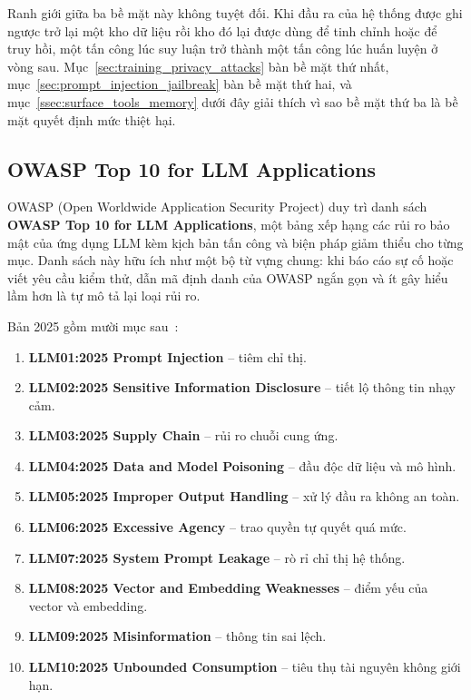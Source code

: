 Ranh giới giữa ba bề mặt này không tuyệt đối. Khi đầu ra của hệ thống được ghi ngược trở lại một kho dữ liệu rồi kho đó lại được dùng để tinh chỉnh hoặc để truy hồi, một tấn công lúc suy luận trở thành một tấn công lúc huấn luyện ở vòng sau. Mục~\ref{sec:training_privacy_attacks} bàn bề mặt thứ nhất, mục~\ref{sec:prompt_injection_jailbreak} bàn bề mặt thứ hai, và mục~\ref{ssec:surface_tools_memory} dưới đây giải thích vì sao bề mặt thứ ba là bề mặt quyết định mức thiệt hại.

\subsection{OWASP Top 10 for LLM Applications}
\label{ssec:owasp_llm_top10}

OWASP (Open Worldwide Application Security Project) duy trì danh sách \textbf{OWASP Top 10 for LLM Applications}, một bảng xếp hạng các rủi ro bảo mật của ứng dụng LLM kèm kịch bản tấn công và biện pháp giảm thiểu cho từng mục. Danh sách này hữu ích như một bộ từ vựng chung: khi báo cáo sự cố hoặc viết yêu cầu kiểm thử, dẫn mã định danh của OWASP ngắn gọn và ít gây hiểu lầm hơn là tự mô tả lại loại rủi ro.

Bản 2025 gồm mười mục sau~\cite{owasp2025llmtop10}:

\begin{enumerate}
	\item \textbf{LLM01:2025 Prompt Injection} -- tiêm chỉ thị.
	\item \textbf{LLM02:2025 Sensitive Information Disclosure} -- tiết lộ thông tin nhạy cảm.
	\item \textbf{LLM03:2025 Supply Chain} -- rủi ro chuỗi cung ứng.
	\item \textbf{LLM04:2025 Data and Model Poisoning} -- đầu độc dữ liệu và mô hình.
	\item \textbf{LLM05:2025 Improper Output Handling} -- xử lý đầu ra không an toàn.
	\item \textbf{LLM06:2025 Excessive Agency} -- trao quyền tự quyết quá mức.
	\item \textbf{LLM07:2025 System Prompt Leakage} -- rò rỉ chỉ thị hệ thống.
	\item \textbf{LLM08:2025 Vector and Embedding Weaknesses} -- điểm yếu của vector và embedding.
	\item \textbf{LLM09:2025 Misinformation} -- thông tin sai lệch.
	\item \textbf{LLM10:2025 Unbounded Consumption} -- tiêu thụ tài nguyên không giới hạn.
\end{enumerate}


